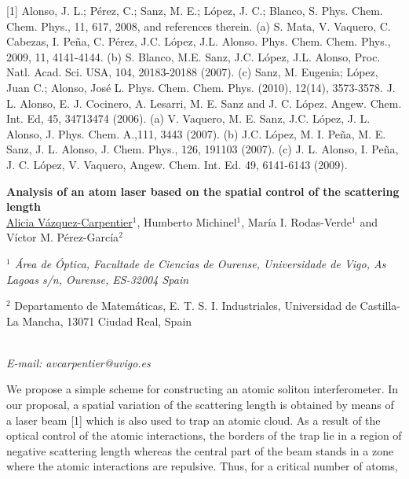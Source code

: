 {\footnotesize
[1] Alonso, J. L.; Pérez, C.; Sanz, M. E.; López, J. C.; Blanco, S. Phys. Chem. Chem. Phys., 11, 617,
2008, and references therein.
\newline
[2] (a) S. Mata, V. Vaquero, C. Cabezas, I. Peña, C. Pérez, J.C. López, J.L. Alonso. Phys. Chem.
Chem. Phys., 2009, 11, 4141-4144. (b) S. Blanco, M.E. Sanz, J.C. López, J.L. Alonso, Proc. Natl.
Acad. Sci. USA, 104, 20183-20188 (2007). (c) Sanz, M. Eugenia; López, Juan C.; Alonso, José L.
Phys. Chem. Chem. Phys. (2010), 12(14), 3573-3578.
\newline
[3] J. L. Alonso, E. J. Cocinero, A. Lesarri, M. E. Sanz and J.  C. López. Angew. Chem. Int. Ed, 45, 34713474 (2006).
\newline
[4] (a) V. Vaquero, M. E. Sanz, J.C. López, J. L. Alonso, J. Phys. Chem. A.,111, 3443 (2007). (b) J.C.
López, M. I. Peña, M. E. Sanz, J. L. Alonso, J. Chem. Phys., 126, 191103 (2007). (c) J. L. Alonso, I. Peña,
J. C. López, V. Vaquero, Angew. Chem. Int. Ed. 49, 6141-6143 (2009).
}
\newpage
\setcounter{figure}{0}
\begin{center}
{\bf \Large
Analysis of an atom laser based on the spatial control of the scattering
length
}
\\
\vspace{0.5cm}
\underline{Alicia Vázquez-Carpentier}$^{1}$, Humberto Michinel$^{1}$, María I. Rodas-Verde$^{1}$ and Víctor M.
Pérez-García$^{2}$
\\
\vspace{0.5cm}
{\it
$^{1}$ Área de Óptica, Facultade de Ciencias de Ourense, Universidade de Vigo, As Lagoas s/n,
Ourense, ES-32004 Spain

$^{2}$ Departamento de Matemáticas, E. T. S. I. Industriales, Universidad de Castilla-La Mancha,
13071 Ciudad Real, Spain
}
\\
\vspace{0.5cm}
{\it E-mail: avcarpentier@uvigo.es}
\\
\vspace{0.5cm}
\end{center}
We propose a simple scheme for constructing an atomic soliton interferometer. In our proposal, a
spatial variation of the scattering length is obtained by means of a laser beam [1] which is also used
to trap an atomic cloud. As a result of the optical control of the atomic interactions, the borders of
the trap lie in a region of negative scattering length whereas the central part of the beam stands in
a zone where the atomic interactions are repulsive. Thus, for a critical number of atoms,
